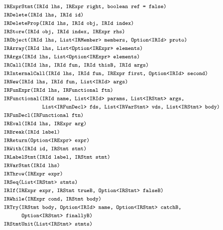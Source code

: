 \documentclass[a4paper, leqno]{amsart}
\newcommand{\mtt}[1]{\mbox{\tt\footnotesize #1}}
\begin{document}
\[
\begin{array}{l}
\\\\

\mtt{IRExprStmt(IRId lhs, IRExpr right, boolean ref = false)}\\
\mtt{IRDelete(IRId lhs, IRId id)}\\

\mtt{IRDeleteProp(IRId lhs, IRId obj, IRId index)}\\

\mtt{IRStore(IRId obj, IRId index, IRExpr rhs)}\\
\mtt{IRObject(IRId lhs, List<IRMember> members, Option<IRId> proto)}\\
\mtt{IRArray(IRId lhs, List<Option<IRExpr>> elements)}\\
\mtt{IRArgs(IRId lhs, List<Option<IRExpr>> elements)}\\
\mtt{IRCall(IRId lhs, IRId fun, IRId thisB, IRId args)}\\
\mtt{IRInternalCall(IRId lhs, IRId fun, IRExpr first, Option<IRId> second)}\\
\mtt{IRNew(IRId lhs, IRId fun, List<IRId> args)}\\
\mtt{IRFunExpr(IRId lhs, IRFunctional ftn)}\\
\mtt{IRFunctional(IRId name, List<IRId> params, List<IRStmt> args,}\\
\mtt{\phantom{IRFunctional(}List<IRFunDecl> fds, List<IRVarStmt> vds, List<IRStmt> body)}\\
\mtt{IRFunDecl(IRFunctional ftn)}\\
\mtt{IREval(IRId lhs, IRExpr arg)}\\
\mtt{IRBreak(IRId label)}\\
\mtt{IRReturn(Option<IRExpr> expr)}\\
\mtt{IRWith(IRId id, IRStmt stmt)}\\
\mtt{IRLabelStmt(IRId label, IRStmt stmt)}\\
\mtt{IRVarStmt(IRId lhs)}\\
\mtt{IRThrow(IRExpr expr)}\\
\mtt{IRSeq(List<IRStmt> stmts)}\\
\mtt{IRIf(IRExpr expr, IRStmt trueB, Option<IRStmt> falseB)}\\
\mtt{IRWhile(IRExpr cond, IRStmt body)}\\
\mtt{IRTry(IRStmt body, Option<IRId> name, Option<IRStmt> catchB,}\\
\mtt{\phantom{IRTry(}Option<IRStmt> finallyB)}\\
\mtt{IRStmtUnit(List<IRStmt> stmts)}\\\\


\end{array}\]
\end{document}
